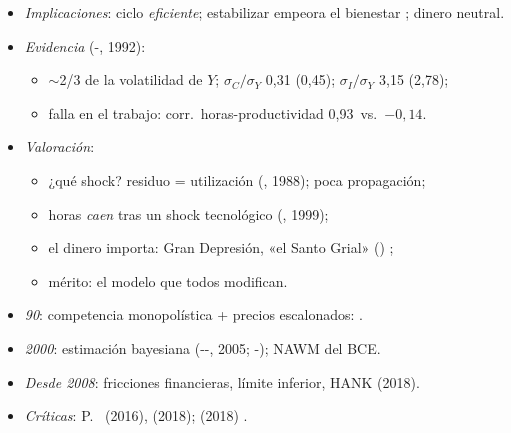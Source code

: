 \documentclass{article}
\begin{document}
\begin{columnas}
\begin{itemize}
\item \emph{Implicaciones}: ciclo \emph{eficiente}; estabilizar empeora el bienestar ; dinero neutral.
\item \emph{Evidencia} (-, 1992):
  \begin{itemize}
  \item $\sim$2/3 de la volatilidad de $Y$; $\sigma_C/\sigma_Y$ 0,31 (0,45); $\sigma_I/\sigma_Y$ 3,15 (2,78);
  \item falla en el trabajo: corr.\ horas-productividad 0,93~vs.\ $-0{,}14$.
  \end{itemize}
\item \emph{Valoración}:
  \begin{itemize}
  \item ¿qué shock? residuo = utilización (, 1988); poca propagación;
  \item horas \emph{caen} tras un shock tecnológico (, 1999);
  \item el dinero importa: Gran Depresión, «el Santo Grial» () ;
  \item mérito: el modelo que todos modifican.
  \end{itemize}
\end{itemize}

\begin{itemize}
\item \emph{90}: competencia monopolística + precios escalonados:  .
\item \emph{2000}: estimación bayesiana (--, 2005; -); NAWM del BCE.
\item \emph{Desde 2008}: fricciones financieras, límite inferior, HANK (2018).
\item \emph{Críticas}: P.\  (2016),  (2018);  (2018) .
\end{itemize}


\end{columnas}
\end{document}
